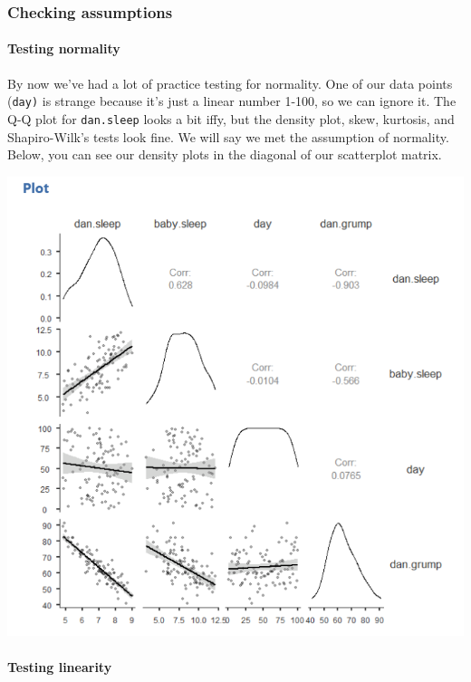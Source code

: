 \documentclass[
]{book}
\begin{document}
\hypertarget{checking-assumptions-6}{%
\subsubsection{Checking assumptions}\label{checking-assumptions-6}}

\hypertarget{testing-normality-3}{%
\paragraph{Testing normality}\label{testing-normality-3}}

By now we've had a lot of practice testing for normality. One of our data points (\texttt{day)} is strange because it's just a linear number 1-100, so we can ignore it. The Q-Q plot for \texttt{dan.sleep} looks a bit iffy, but the density plot, skew, kurtosis, and Shapiro-Wilk's tests look fine. We will say we met the assumption of normality. Below, you can see our density plots in the diagonal of our scatterplot matrix.

\includegraphics{images/08-correlation/correlation-plots.png}

\hypertarget{testing-linearity}{%
\paragraph{Testing linearity}\label{testing-linearity}}
\end{document}
